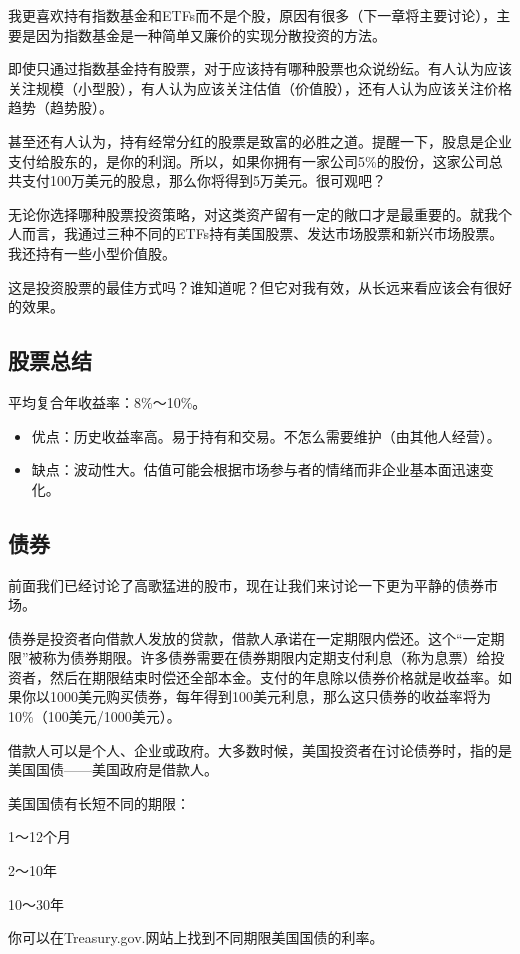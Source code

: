我更喜欢持有指数基金和ETFs而不是个股，原因有很多（下一章将主要讨论），主要是因为指数基金是一种简单又廉价的实现分散投资的方法。

即使只通过指数基金持有股票，对于应该持有哪种股票也众说纷纭。有人认为应该关注规模（小型股），有人认为应该关注估值（价值股），还有人认为应该关注价格趋势（趋势股）。

甚至还有人认为，持有经常分红的股票是致富的必胜之道。提醒一下，股息是企业支付给股东的，是你的利润。所以，如果你拥有一家公司5\%的股份，这家公司总共支付100万美元的股息，那么你将得到5万美元。很可观吧？

无论你选择哪种股票投资策略，对这类资产留有一定的敞口才是最重要的。就我个人而言，我通过三种不同的ETFs持有美国股票、发达市场股票和新兴市场股票。我还持有一些小型价值股。

这是投资股票的最佳方式吗？谁知道呢？但它对我有效，从长远来看应该会有很好的效果。

\subsection{股票总结}
平均复合年收益率：8\%～10\%。

\begin{itemize}
\item 优点：历史收益率高。易于持有和交易。不怎么需要维护（由其他人经营）。
\item 缺点：波动性大。估值可能会根据市场参与者的情绪而非企业基本面迅速变化。
\end{itemize}
\subsection{债券}
前面我们已经讨论了高歌猛进的股市，现在让我们来讨论一下更为平静的债券市场。

债券是投资者向借款人发放的贷款，借款人承诺在一定期限内偿还。这个“一定期限”被称为债券期限。许多债券需要在债券期限内定期支付利息（称为息票）给投资者，然后在期限结束时偿还全部本金。支付的年息除以债券价格就是收益率。如果你以1000美元购买债券，每年得到100美元利息，那么这只债券的收益率将为10\%（100美元/1000美元）。

借款人可以是个人、企业或政府。大多数时候，美国投资者在讨论债券时，指的是美国国债——美国政府是借款人。

美国国债有长短不同的期限：

1～12个月

2～10年

10～30年

你可以在Treasury.gov.网站上找到不同期限美国国债的利率。

